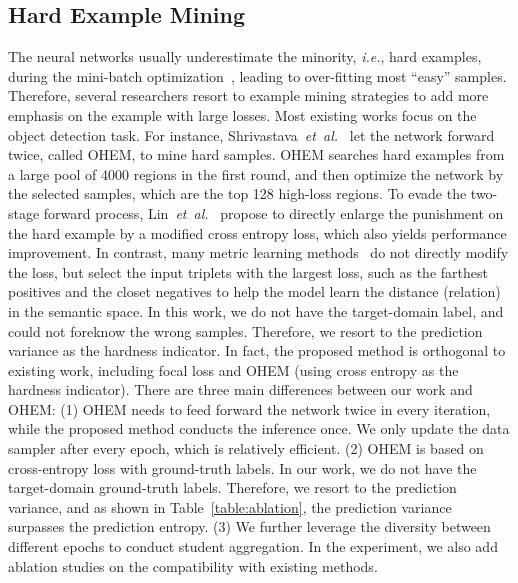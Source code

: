 \documentclass[journal]{IEEEtran}
\def\ie{\emph{i.e.}}
\def\etal{\emph{et~al.}}
\begin{document}
\subsection{Hard Example Mining} 
The neural networks usually underestimate the minority, \ie, hard examples, during the mini-batch optimization~\cite{lin2017focal}, leading to over-fitting most ``easy'' samples. Therefore, several researchers resort to  example mining strategies to add more emphasis on the example with large losses. Most existing works focus on the object detection task. For instance, Shrivastava~\etal~\cite{shrivastava2016training} let the network forward twice, called OHEM, to mine hard samples. OHEM searches hard examples from a large pool of 4000 regions in the first round, and then optimize the network by the selected samples, which are the top 128 high-loss regions. To evade the two-stage forward process,  Lin~\etal~\cite{lin2017focal} propose to directly enlarge the punishment on the hard example by a modified cross entropy loss, which also yields performance improvement. 
In contrast, many metric learning methods~\cite{oh2016deep,hermans2017defense} do not directly modify the loss, but select the input triplets with the largest loss, such as the farthest positives and the closet negatives to help the model learn the distance (relation) in the semantic space. In this work, we do not have the target-domain label, and could not foreknow the wrong samples. Therefore, we resort to the prediction variance as the hardness indicator. In fact, the proposed method is orthogonal to existing work, including focal loss and OHEM (using cross entropy as the hardness indicator). There are three main differences between our work and OHEM: (1) OHEM needs to feed forward the network twice in every iteration, while the proposed method conducts the inference once. We only update the data sampler after every epoch, which is relatively efficient. (2) OHEM is based on cross-entropy loss with ground-truth labels. In our work, we do not have the target-domain ground-truth labels. Therefore, we resort to the prediction variance, and as shown in Table~\ref{table:ablation}, the prediction variance surpasses the prediction entropy.  (3) We further leverage the diversity between different epochs to conduct student aggregation. In the experiment, we also add ablation studies on the compatibility with existing methods.  
\end{document}
